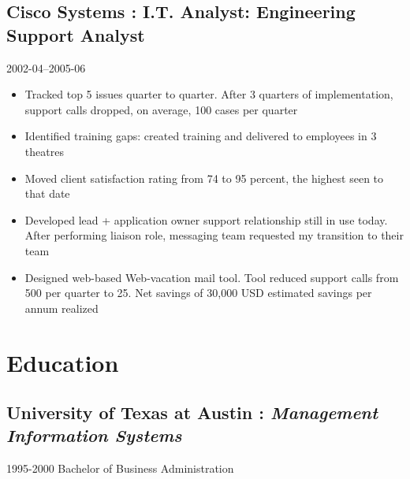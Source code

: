 \documentclass[]{article}
\begin{document}
\subsection*{Cisco Systems : I.T. Analyst: Engineering Support Analyst}
  \label{ciscosystems_rdfa_cisco_2_title:_rdfa_cisco_2_desc}
  2002-04--2005-06
\begin{itemize}
    \item{Tracked top 5 issues quarter to quarter. After 3 quarters of implementation, support calls dropped, on average, 100 cases per quarter}
    \item{Identified training gaps: created training and delivered to employees in 3 theatres}
    \item{Moved client satisfaction rating from 74 to 95 percent, the highest seen to that date}
    \item{Developed lead + application owner support relationship still in use today. After performing liaison role, messaging team requested my transition to their team}
    \item{Designed web-based Web-vacation mail tool. Tool reduced support calls from 500 per quarter to 25. Net savings of 30,000 USD estimated savings per annum realized
}
\end{itemize}
       

























\section*{Education}


	\subsection*{\textbf{University of Texas at Austin} : \textit{Management Information Systems}}
  \label{_universityoftexasataustin_managementinformationsystems}
  \textsf{1995-2000}
\vspace{0.02in}
Bachelor of Business Administration\\
\end{document}
